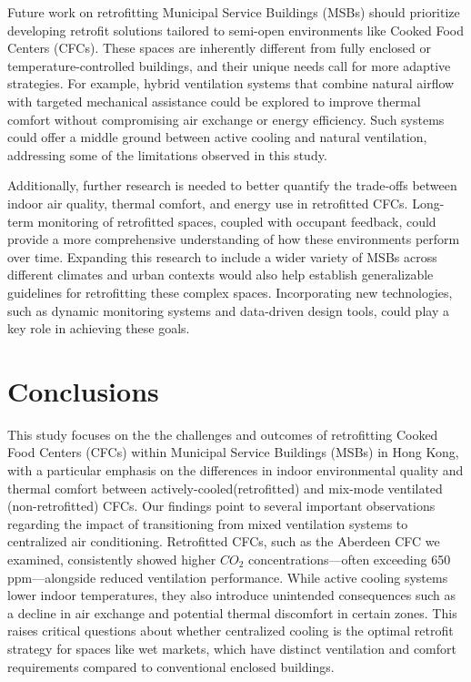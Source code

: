 \documentclass[preprint,12pt]{elsarticle}
\begin{document}
Future work on retrofitting Municipal Service Buildings (MSBs) should prioritize developing retrofit solutions tailored to semi-open environments like Cooked Food Centers (CFCs). These spaces are inherently different from fully enclosed or temperature-controlled buildings, and their unique needs call for more adaptive strategies. For example, hybrid ventilation systems that combine natural airflow with targeted mechanical assistance could be explored to improve thermal comfort without compromising air exchange or energy efficiency\cite{39}. Such systems could offer a middle ground between active cooling and natural ventilation, addressing some of the limitations observed in this study.

Additionally, further research is needed to better quantify the trade-offs between indoor air quality, thermal comfort, and energy use in retrofitted CFCs\cite{40,41}. Long-term monitoring of retrofitted spaces, coupled with occupant feedback, could provide a more comprehensive understanding of how these environments perform over time. Expanding this research to include a wider variety of MSBs across different climates and urban contexts would also help establish generalizable guidelines for retrofitting these complex spaces. Incorporating new technologies, such as dynamic monitoring systems\cite{42} and data-driven design tools, could play a key role in achieving these goals. 


\section{Conclusions}

This study focuses on the the challenges and outcomes of retrofitting Cooked Food Centers (CFCs) within Municipal Service Buildings (MSBs) in Hong Kong, with a particular emphasis on the differences in indoor environmental quality and thermal comfort between actively-cooled(retrofitted) and mix-mode ventilated (non-retrofitted) CFCs. Our findings point to several important observations regarding the impact of transitioning from mixed ventilation systems to centralized air conditioning. Retrofitted CFCs, such as the Aberdeen CFC we examined, consistently showed higher $CO_2$ concentrations—often exceeding 650 ppm—alongside reduced ventilation performance. While active cooling systems lower indoor temperatures, they also introduce unintended consequences such as a decline in air exchange and potential thermal discomfort in certain zones. This raises critical questions about whether centralized cooling is the optimal retrofit strategy for spaces like wet markets, which have distinct ventilation and comfort requirements compared to conventional enclosed buildings.
\end{document}
